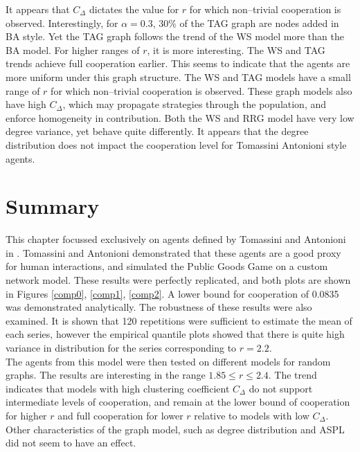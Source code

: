 It appears that $C_\Delta$ dictates the value for $r$ for which non--trivial cooperation is observed. Interestingly, for $\alpha = 0.3$, 30\% of the TAG graph are nodes added in BA style. Yet the TAG graph follows the trend of the WS model more than the BA model.
\FloatBarrier
{}
\FloatBarrier
For higher ranges of $r$, it is more interesting. The WS and TAG trends achieve full cooperation earlier. This seems to indicate that the agents are more uniform under this graph structure. The WS and TAG models have a small range of $r$ for which non--trivial cooperation is observed. These graph models also have high $C_\Delta$, which may propagate strategies through the population, and enforce homogeneity in contribution. Both the WS and RRG model have very low degree variance, yet behave quite differently. It appears that the degree distribution does not impact the cooperation level for Tomassini Antonioni style agents. \\

\section{Summary}

This chapter focussed exclusively on agents defined by Tomassini and Antonioni in \cite{RN49}. Tomassini and Antonioni demonstrated that these agents are a good proxy for human interactions, and simulated the Public Goods Game on a custom network model. These results were perfectly replicated, and both plots are shown in Figures \ref{comp0}, \ref{comp1}, \ref{comp2}.  A lower bound for cooperation of 0.0835 was demonstrated analytically. The robustness of these results were also examined. It is shown that 120 repetitions were sufficient to estimate the mean of each series, however the empirical quantile plots showed that there is quite high variance in distribution for the series corresponding to $r=2.2$.\\ 

The agents from this model were then tested on different models for random graphs. The results are interesting in the range $1.85\leq r \leq 2.4$. The trend indicates that models with high clustering coefficient $C_\Delta$ do not support intermediate levels of cooperation, and remain at the lower bound of cooperation for higher $r$ and full cooperation for lower $r$ relative to models with low $C_\Delta$. Other characteristics of the graph model, such as degree distribution and ASPL did not seem to have an effect. \\



